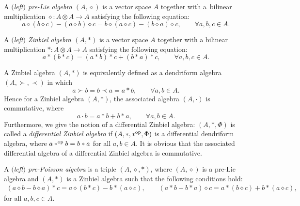 \documentclass[pdftex]{sigma}
\numberwithin{equation}{section}
\begin{document}
\begin{Definition}
 A \textit{$($left$)$ pre-Lie algebra $(A,\diamond)$} is a vector space $A$ together with a~bilinear multiplication $\diamond\colon A \otimes A \to A$ satisfying the following equation:
 \begin{equation*}
 a \diamond (b \diamond c) - (a \diamond b) \diamond c = b \diamond (a \diamond c) - (b \diamond a) \diamond c, \qquad \forall a, b, c \in A.
 \end{equation*}
\end{Definition}

\begin{Definition}
 A \textit{$($left$)$ Zinbiel algebra $(A,\ast)$} is a vector space $A$ together with a bilinear multiplication $\ast\colon A \otimes A \to A$ satisfying the following equation:
 \begin{equation*}
 a \ast (b \ast c) = (a \ast b) \ast c + (b \ast a) \ast c, \qquad \forall a, b, c \in A.
 \end{equation*}
\end{Definition}

A Zinbiel algebra $(A, \ast)$ is equivalently defined as a dendriform algebra $(A, \succ, \prec)$ in which
\begin{equation*}
 a \succ b = b \prec a = a \ast b, \qquad \forall a, b \in A.
\end{equation*}
Hence for a Zinbiel algebra $(A, \ast)$, the associated algebra $(A, \cdot)$ is commutative,
where
\begin{equation}
 a \cdot b = a \ast b + b \ast a, \qquad \forall a, b \in A. \label{eq:Zin}
\end{equation}
Furthermore, we give the notion of a differential Zinbiel algebra:
$(A, \ast, \Phi)$ is called a \textit{differential Zinbiel algebra}
if $(A, \ast, \ast^{\rm op}, \Phi)$ is a differential dendriform algebra,
where $a \ast^{\rm op} b = b \ast a$ for all $a, b \in A$.
It is obvious that the associated differential algebra of a differential Zinbiel algebra is commutative.

\begin{Definition}
 A \textit{$($left$)$ pre-Poisson algebra} is a triple $(A, \diamond, \ast)$,
 where $(A, \diamond)$ is a pre-Lie algebra and
 $(A, \ast)$ is a Zinbiel algebra
 such that the following conditions hold:
 \begin{gather*}
 (a \diamond b - b \diamond a) \ast c = a \diamond (b \ast c) - b \ast (a \diamond c), \qquad
 (a \ast b + b \ast a) \diamond c = a \ast (b \diamond c) + b \ast (a \diamond c),
 \end{gather*}
	for all $a, b, c \in A$.
\end{Definition}
\end{document}
